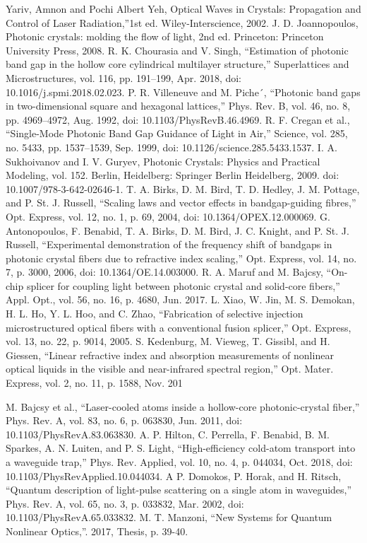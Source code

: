 \begin{thebibliography}{99}
 Yariv, Amnon and Pochi Albert Yeh, Optical Waves in Crystals: Propagation and Control of Laser Radiation,”1st ed. Wiley-Interscience, 2002.
 J. D. Joannopoulos, Photonic crystals: molding the flow of light, 2nd ed. Princeton: Princeton University Press, 2008.
R. K. Chourasia and V. Singh, “Estimation of photonic band gap in the hollow core cylindrical multilayer structure,” Superlattices and Microstructures, vol. 116, pp. 191–199, Apr. 2018, doi: 10.1016/j.spmi.2018.02.023.
 P. R. Villeneuve and M. Piche´, “Photonic band gaps in two-dimensional square and hexagonal lattices,” Phys. Rev. B, vol. 46, no. 8, pp. 4969–4972, Aug. 1992, doi: 10.1103/PhysRevB.46.4969.
R. F. Cregan et al., “Single-Mode Photonic Band Gap Guidance of Light in Air,” Science, vol. 285, no. 5433, pp. 1537–1539, Sep. 1999, doi: 10.1126/science.285.5433.1537.
 I. A. Sukhoivanov and I. V. Guryev, Photonic Crystals: Physics and Practical Modeling, vol. 152. Berlin, Heidelberg: Springer Berlin Heidelberg, 2009. doi: 10.1007/978-3-642-02646-1.
 T. A. Birks, D. M. Bird, T. D. Hedley, J. M. Pottage, and P. St. J. Russell, “Scaling laws and vector effects in bandgap-guiding fibres,” Opt. Express, vol. 12, no. 1, p. 69, 2004, doi: 10.1364/OPEX.12.000069.
 G. Antonopoulos, F. Benabid, T. A. Birks, D. M. Bird, J. C. Knight, and P. St. J. Russell, “Experimental demonstration of the frequency shift of bandgaps in photonic crystal fibers due to refractive index scaling,” Opt. Express, vol. 14, no. 7, p. 3000, 2006, doi: 10.1364/OE.14.003000.
 R. A. Maruf and M. Bajcsy, “On-chip splicer for coupling light between
photonic crystal and solid-core fibers,” Appl. Opt., vol. 56, no. 16, p.
4680, Jun. 2017.
 L. Xiao, W. Jin, M. S. Demokan, H. L. Ho, Y. L. Hoo, and C. Zhao,
“Fabrication of selective injection microstructured optical fibers with a
conventional fusion splicer,” Opt. Express, vol. 13, no. 22, p. 9014, 2005.
 S. Kedenburg, M. Vieweg, T. Gissibl, and H. Giessen, “Linear refractive
index and absorption measurements of nonlinear optical liquids in the
visible and near-infrared spectral region,” Opt. Mater. Express, vol. 2,
no. 11, p. 1588, Nov. 201

 M. Bajcsy et al., “Laser-cooled atoms inside a hollow-core photonic-crystal fiber,” Phys. Rev. A, vol. 83, no. 6, p. 063830, Jun. 2011, doi: 10.1103/PhysRevA.83.063830. 
 A. P. Hilton, C. Perrella, F. Benabid, B. M. Sparkes, A. N. Luiten, and P. S. Light, “High-efficiency cold-atom transport into a waveguide trap,” Phys. Rev. Applied, vol. 10, no. 4, p. 044034, Oct. 2018, doi: 10.1103/PhysRevApplied.10.044034. A
 P. Domokos, P. Horak, and H. Ritsch, “Quantum description of light-pulse scattering on a single atom in waveguides,” Phys. Rev. A, vol. 65, no. 3, p. 033832, Mar. 2002, doi: 10.1103/PhysRevA.65.033832.
 M. T. Manzoni, “New Systems for Quantum Nonlinear Optics,”. 2017, Thesis, p. 39-40.


\end{thebibliography}
